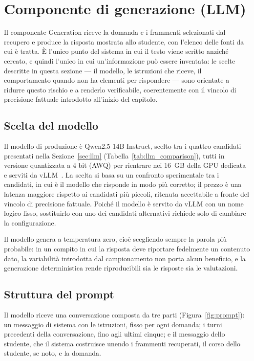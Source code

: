 \section{Componente di generazione (LLM)}\label{sec:generazione}

Il componente Generation riceve la domanda e i frammenti selezionati dal recupero e produce la risposta mostrata allo
studente, con l'elenco delle fonti da cui è tratta. È l'unico punto del sistema in cui il testo viene scritto anziché
cercato, e quindi l'unico in cui un'informazione può essere inventata: le scelte descritte in questa sezione ---
il modello, le istruzioni che riceve, il comportamento quando non ha elementi per rispondere --- sono orientate a ridurre questo rischio e a renderlo verificabile, coerentemente con il vincolo di
precisione fattuale introdotto all'inizio del capitolo.

\subsection{Scelta del modello}\label{sec:scelta-modello}

Il modello di produzione è Qwen2.5-14B-Instruct, scelto tra i quattro candidati presentati nella
Sezione~\ref{sec:llm} (Tabella~\ref{tab:llm_comparison}), tutti in versione quantizzata a 4 bit (AWQ) per
rientrare nei 16~GB della GPU dedicata e serviti da vLLM~\cite{kwon2023vllm}. La scelta si basa su un confronto
sperimentale tra i candidati, in cui è il modello che risponde in modo più corretto;
il prezzo è una latenza maggiore rispetto ai candidati più piccoli, ritenuta accettabile a fronte del vincolo di
precisione fattuale. Poiché il modello è servito da vLLM con un nome logico fisso, sostituirlo con uno dei candidati
alternativi richiede solo di cambiare la configurazione.

Il modello genera a temperatura zero, cioè scegliendo sempre la parola più probabile: in un compito in cui la
risposta deve riportare fedelmente un contenuto dato, la variabilità introdotta dal campionamento non porta alcun
beneficio, e la generazione deterministica rende riproducibili sia le risposte sia le valutazioni.

\subsection{Struttura del prompt}\label{sec:prompt}

Il modello riceve una conversazione composta da tre parti (Figura~\ref{fig:prompt}): un messaggio di sistema con le
istruzioni, fisso per ogni domanda; i turni precedenti della conversazione, fino agli ultimi cinque; e il messaggio
dello studente, che il sistema costruisce unendo i frammenti recuperati, il corso dello studente, se noto, e la
domanda.

